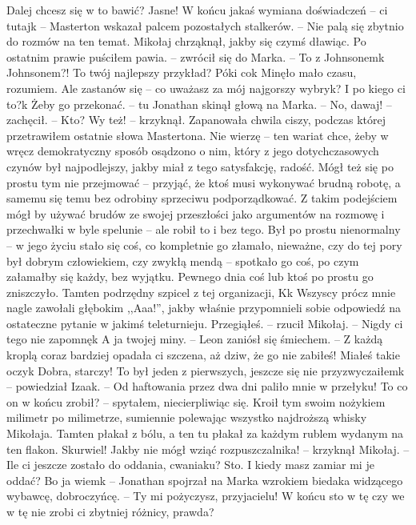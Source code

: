 \documentclass[../MAIN.tex]{subfiles}
\begin{document}
\xx Dalej chcesz się w to bawić?
\xx Jasne! W końcu jakaś wymiana doświadczeń -- ci tutaj\3k -- Masterton wskazał palcem pozostałych stalkerów. -- Nie palą się zbytnio do rozmów na ten temat.
\qd
Mikołaj chrząknął, jakby się czymś dławiąc.
\sx Po ostatnim prawie puściłem pawia. -- zwrócił się do Marka. -- To z Johnsonem\3k
\xx Johnsonem?! To twój najlepszy przykład?
\xx Póki co\3k
\xx Minęło mało czasu, rozumiem. Ale zastanów się -- co uważasz za mój najgorszy wybryk?
\xx I po kiego ci to?\3k
\xx Żeby go przekonać. -- tu Jonathan skinął głową na Marka. -- No, dawaj! -- zachęcił. -- Kto? Wy też! -- krzyknął.
\qd
Zapanowała chwila ciszy, podczas której przetrawiłem ostatnie słowa Mastertona. Nie wierzę -- ten wariat chce, żeby w wręcz demokratyczny sposób osądzono o nim, który z jego dotychczasowych czynów był najpodlejszy, jakby miał z tego satysfakcję, radość. Mógł też się po prostu tym nie przejmować -- przyjąć, że ktoś musi wykonywać brudną robotę, a samemu się temu bez odrobiny sprzeciwu podporządkować. Z takim podejściem mógł by używać brudów ze swojej przeszłości jako argumentów na rozmowę i przechwałki w byle spelunie -- ale robił to i bez tego. Był po prostu nienormalny -- w jego życiu stało się coś, co kompletnie go złamało, nieważne, czy do tej pory był dobrym człowiekiem, czy zwykłą mendą -- spotkało go coś, po czym załamałby się każdy, bez wyjątku. Pewnego dnia coś lub ktoś po prostu go zniszczyło.
\sx Tamten podrzędny szpicel z tej organizacji, K\3k
\qd
Wszyscy prócz mnie nagle zawołali głębokim ,,Aaa!'', jakby właśnie przypomnieli sobie odpowiedź na ostateczne pytanie w jakimś teleturnieju.
\sx Przegiąłeś. -- rzucił Mikołaj. -- Nigdy ci tego nie zapomnę\3k
\xx A ja twojej miny. -- Leon zaniósł się śmiechem. -- Z każdą kroplą coraz bardziej opadała ci szczena, aż dziw, że go nie zabiłeś! Miałeś takie oczy\3k
\xx Dobra, starczy!
\xx To był jeden z pierwszych, jeszcze się nie przyzwyczaiłem\3k -- powiedział Izaak. -- Od haftowania przez dwa dni paliło mnie w przełyku!
\xx To co on w końcu zrobił? -- spytałem, niecierpliwiąc się.
\xx Kroił tym swoim nożykiem milimetr po milimetrze, sumiennie polewając wszystko najdroższą whisky Mikołaja.
\qd
Tamten płakał z bólu, a ten tu płakał za każdym rublem wydanym na ten flakon.
\sx Skurwiel! Jakby nie mógł wziąć rozpuszczalnika! -- krzyknął Mikołaj. -- Ile ci jeszcze zostało do oddania, cwaniaku?
\xx Sto.
\xx I kiedy masz zamiar mi je oddać?
\xx Bo ja wiem\3k -- Jonathan spojrzał na Marka wzrokiem biedaka widzącego wybawcę, dobroczyńcę. -- Ty mi pożyczysz, przyjacielu! W końcu sto w tę czy we w tę nie zrobi ci zbytniej różnicy, prawda?
\end{document}
